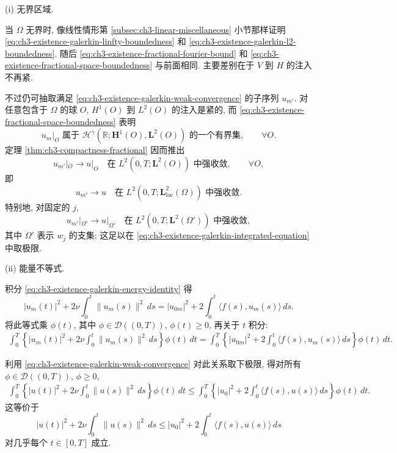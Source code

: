 \begin{Remark}
\label{rem:ch3-existence-unbounded-energy}
(i) 无界区域.

当 $\Omega$ 无界时, 像线性情形第 \ref{subsec:ch3-linear-miscellaneous} 小节那样证明 \eqref{eq:ch3-existence-galerkin-linfty-boundedness} 和 \eqref{eq:ch3-existence-galerkin-l2-boundedness}. 随后 \eqref{eq:ch3-existence-fractional-fourier-bound} 和 \eqref{eq:ch3-existence-fractional-space-boundedness} 与前面相同. 主要差别在于 $V$ 到 $H$ 的注入不再紧.

不过仍可抽取满足 \eqref{eq:ch3-existence-galerkin-weak-convergence} 的子序列 $u_{m'}$. 对任意包含于 $\Omega$ 的球 $O$, $H^1(O)$ 到 $L^2(O)$ 的注入是紧的, 而 \eqref{eq:ch3-existence-fractional-space-boundedness} 表明
\begin{equation}
u_m|_O\text{ 属于 }\mathcal H^\gamma(\mathbb R;\mathbf H^1(O),\mathbf L^2(O))\text{ 的一个有界集},
\qquad\forall O.
\label{eq:ch3-existence-local-fractional-boundedness}
\end{equation}
定理 \ref{thm:ch3-compactness-fractional} 因而推出
\[
u_{m'}|_O\longrightarrow u|_O
\quad\text{在 }L^2(0,T;\mathbf L^2(O))\text{ 中强收敛},
\qquad\forall O,
\]
即
\[
u_{m'}\longrightarrow u
\quad\text{在 }L^2(0,T;\mathbf L_{\mathrm{loc}}^2(\Omega))\text{ 中强收敛}.
\]
特别地, 对固定的 $j$,
\[
u_{m'}|_{\Omega'}\longrightarrow u|_{\Omega'}
\quad\text{在 }L^2(0,T;\mathbf L^2(\Omega'))\text{ 中强收敛},
\]
其中 $\Omega'$ 表示 $w_j$ 的支集; 这足以在 \eqref{eq:ch3-existence-galerkin-integrated-equation} 中取极限.

(ii) 能量不等式.

积分 \eqref{eq:ch3-existence-galerkin-energy-identity} 得
\[
|u_m(t)|^2+2\nu\int_0^t\lVert u_m(s)\rVert^2\,ds
=|u_{0m}|^2+2\int_0^t\langle f(s),u_m(s)\rangle\,ds.
\]
将此等式乘 $\phi(t)$, 其中 $\phi\in\mathcal D((0,T))$, $\phi(t)\geq0$, 再关于 $t$ 积分:
\[
\begin{aligned}
\int_0^T\left\{|u_m(t)|^2+2\nu\int_0^t\lVert u_m(s)\rVert^2\,ds\right\}\phi(t)\,dt
=\int_0^T\left\{|u_{0m}|^2+2\int_0^t\langle f(s),u_m(s)\rangle\,ds\right\}\phi(t)\,dt.
\end{aligned}
\]

\hypertarget{chapter-03-page-212}{}
利用 \eqref{eq:ch3-existence-galerkin-weak-convergence} 对此关系取下极限, 得对所有 $\phi\in\mathcal D((0,T))$, $\phi\geq0$,
\[
\begin{aligned}
\int_0^T\left\{|u(t)|^2+2\nu\int_0^t\lVert u(s)\rVert^2\,ds\right\}\phi(t)\,dt
\leq\int_0^T\left\{|u_0|^2+2\int_0^t\langle f(s),u(s)\rangle\,ds\right\}\phi(t)\,dt.
\end{aligned}
\]
这等价于
\begin{equation}
|u(t)|^2+2\nu\int_0^t\lVert u(s)\rVert^2\,ds
\leq|u_0|^2+2\int_0^t\langle f(s),u(s)\rangle\,ds
\label{eq:ch3-existence-energy-inequality}
\end{equation}
对几乎每个 $t\in[0,T]$ 成立.


\end{Remark}
